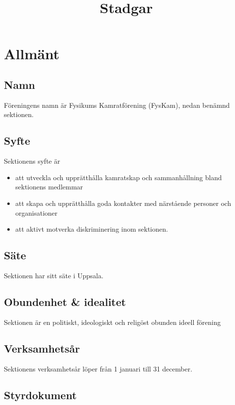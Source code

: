 \documentclass{../resources/dgovdoc}
\title{Stadgar}
\begin{document}
\maketitle

\section{Allmänt}

\subsection{Namn}
\label{sec:namn}

Föreningens namn är Fysikums Kamratförening (FysKam), nedan benämnd sektionen.

\subsection{Syfte}

Sektionens syfte är

\begin{itemize}
  \item att utveckla och upprätthålla kamratskap och sammanhållning bland
    sektionens medlemmar
  \item att skapa och upprätthålla goda kontakter med närstående personer och
    organisationer
  \item att aktivt motverka diskriminering inom sektionen.
\end{itemize}

\subsection{Säte}

Sektionen har sitt säte i Uppsala.

\subsection{Obundenhet \& idealitet}

Sektionen är en politiskt, ideologiskt och religöst obunden ideell förening

\subsection{Verksamhetsår}

Sektionens verksamhetsår löper från 1 januari till 31 december.

\subsection{Styrdokument}
\label{sec:styrdokument}
\end{document}
